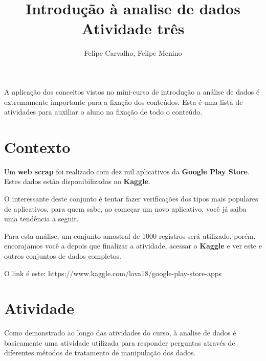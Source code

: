\documentclass[12pt]{article}
\title{Introdução à analise de dados\\ Atividade três}
\author{Felipe Carvalho\inst{1}, Felipe Menino\inst{1}}
\begin{document}
 

\maketitle

     
\begin{resumo} 
    A aplicação dos conceitos vistos no mini-curso de introdução a análise de dados é extremamente importante para a fixação dos conteúdos. Esta é uma lista de atividades para auxiliar o aluno na fixação de todo o conteúdo.
\end{resumo}

\section{Contexto}

Um \textbf{web scrap} foi realizado com dez mil aplicativos da \textbf{Google Play Store}. Estes dados estão disponibilizados no \textbf{Kaggle}.

O interessante deste conjunto é tentar fazer verificações dos tipos mais populares de aplicativos, para quem sabe, ao começar um novo aplicativo, você já saiba uma tendência a seguir.

Para esta análise, um conjunto amostral de 1000 registros será utilizado, porém, encorajamos você a depois que finalizar a atividade, acessar o \textbf{Kaggle} e ver este e outros conjuntos de dados completos.

O link é este: https://www.kaggle.com/lava18/google-play-store-apps

\section{Atividade}

Como demonstrado ao longo das atividades do curso, à analise de dados é basicamente uma atividade utilizada para responder perguntas através de diferentes métodos de tratamento de manipulação dos dados.
\end{document}
